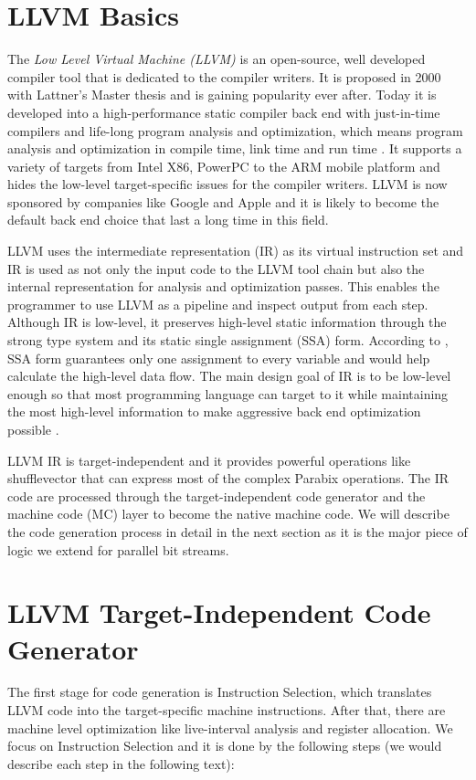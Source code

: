 \section{LLVM Basics}
The \textit{Low Level Virtual Machine (LLVM)} is an open-source, well developed compiler tool that is dedicated to the compiler writers. It is proposed in 2000 with Lattner's Master thesis \cite{chris_msthesis} and is gaining popularity ever after. Today it is developed into a high-performance static compiler back end with just-in-time compilers and life-long program analysis and optimization, which means program analysis and optimization in compile time, link time and run time \cite{llvm_ghc, llvm_cgo04}. It supports a variety of targets from Intel X86, PowerPC to the ARM mobile platform and hides the low-level target-specific issues for the compiler writers. LLVM is now sponsored by companies like Google and Apple and it is likely to become the default back end choice that last a long time in this field.

LLVM uses the intermediate representation (IR) as its virtual instruction set and IR is used as not only the input code to the LLVM tool chain but also the internal representation for analysis and optimization passes. This enables the programmer to use LLVM as a pipeline and inspect output from each step. Although IR is low-level, it preserves high-level static information through the strong type system and its static single assignment (SSA) form. According to \cite{cytron1991efficiently}, SSA form guarantees only one assignment to every variable and would help calculate the high-level data flow. The main design goal of IR is to be low-level enough so that most programming language can target to it while maintaining the most high-level information to make aggressive back end optimization possible \cite{llvm_ghc}.

LLVM IR is target-independent and it provides powerful operations like shufflevector that can express most of the complex Parabix operations. The IR code are processed through the target-independent code generator and the machine code (MC) layer to become the native machine code. We will describe the code generation process in detail in the next section as it is the major piece of logic we extend for parallel bit streams.

\section{LLVM Target-Independent Code Generator}
The first stage for code generation is Instruction Selection, which translates LLVM code into the target-specific machine instructions. After that, there are machine level optimization like live-interval analysis and register allocation. We focus on Instruction Selection and it is done by the following steps \cite{llvm_code_gen} (we would describe each step in the following text):

